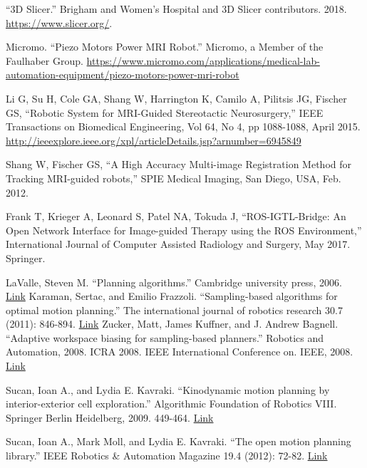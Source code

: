 \documentclass[12pt]{report}
\begin{document}
\begin{thebibliography}{99}
 ``3D Slicer.'' Brigham and Women's Hospital and 3D Slicer contributors. 2018. \url{https://www.slicer.org/}.

 Micromo. ``Piezo Motors Power MRI Robot.'' Micromo, a Member of the Faulhaber Group.  \url{https://www.micromo.com/applications/medical-lab-automation-equipment/piezo-motors-power-mri-robot}

 Li G, Su H, Cole GA, Shang W, Harrington K, Camilo A, Pilitsis JG, Fischer GS, ``Robotic System for MRI-Guided Stereotactic Neurosurgery,'' IEEE Transactions on Biomedical Engineering, Vol 64, No 4, pp 1088-1088, April 2015. \url{http://ieeexplore.ieee.org/xpl/articleDetails.jsp?arnumber=6945849}

 Shang W, Fischer GS, ``A High Accuracy Multi-image Registration Method for Tracking MRI-guided robots,'' SPIE Medical Imaging, San Diego, USA, Feb. 2012.

 Frank T, Krieger A, Leonard S, Patel NA, Tokuda J, ``ROS-IGTL-Bridge: An Open Network Interface for Image-guided Therapy using the ROS Environment,'' International Journal of Computer Assisted Radiology and Surgery, May 2017. Springer.

 LaValle, Steven M. ``Planning algorithms.'' Cambridge university press, 2006. \href{http://citeseerx.ist.psu.edu/viewdoc/download?doi=10.1.1.225.1874&rep=rep1&type=pdf}{Link}
 Karaman, Sertac, and Emilio Frazzoli. ``Sampling-based algorithms for optimal motion planning.'' The international journal of robotics research 30.7 (2011): 846-894. \href{http://citeseerx.ist.psu.edu/viewdoc/download?doi=10.1.1.419.5503&rep=rep1&type=pdf}{Link}
 Zucker, Matt, James Kuffner, and J. Andrew Bagnell. ``Adaptive workspace biasing for sampling-based planners.'' Robotics and Automation, 2008. ICRA 2008. IEEE International Conference on. IEEE, 2008. \href{http://www.ri.cmu.edu/pub_files/pub4/zucker_matthew_2008_1/zucker_matthew_2008_1.pdf}{Link}

 Sucan, Ioan A., and Lydia E. Kavraki. ``Kinodynamic motion planning by interior-exterior cell exploration.'' Algorithmic Foundation of Robotics VIII. Springer Berlin Heidelberg, 2009. 449-464. \href{http://www.wafr.org/wafr2008/papers/wafr08-sucan.pdf}{Link}

 Sucan, Ioan A., Mark Moll, and Lydia E. Kavraki. ``The open motion planning library.'' IEEE Robotics \& Automation Magazine 19.4 (2012): 72-82. \href{http://ieeexplore.ieee.org/abstract/document/6377468/}{Link}


\end{thebibliography}
\end{document}
